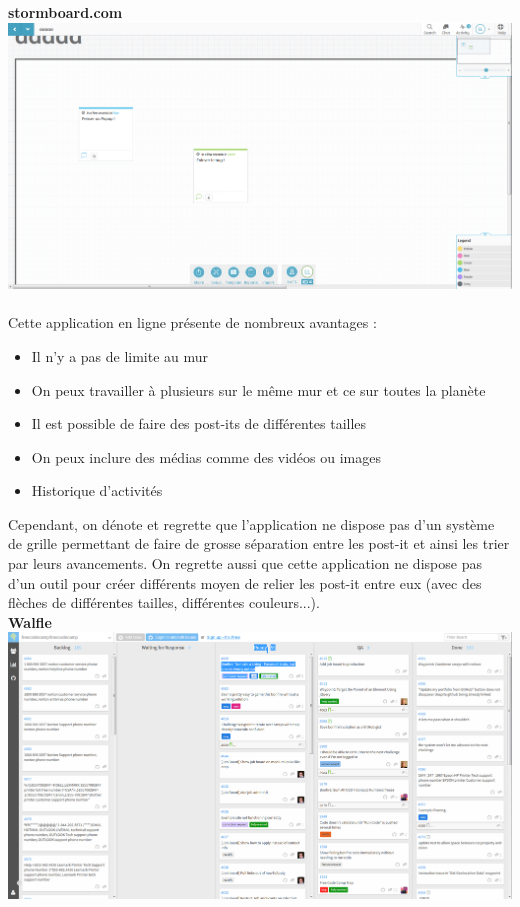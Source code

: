 \documentclass{article}
\begin{document}
\textbf{stormboard.com}
\vspace{0.2cm}\\
\includegraphics[width=\textwidth]{2}\\
\vspace{0.2cm}\\
Cette application en ligne présente de nombreux avantages :
\begin{itemize}
  \item Il n'y a pas de limite au mur
  \item On peux travailler à plusieurs sur le même mur et ce sur toutes la planète
  \item Il est possible de faire des post-its de différentes tailles
  \item On peux inclure des médias comme des vidéos ou images
  \item Historique d'activités
\end{itemize}
\vspace{0.2cm}
\hspace*{0.6cm}Cependant, on dénote et regrette que l'application ne dispose pas d'un système de grille permettant de faire de grosse séparation entre les post-it et ainsi les trier par leurs avancements. On regrette aussi que cette application ne dispose pas d'un outil pour créer différents moyen de relier les post-it entre eux (avec des flèches de différentes tailles, différentes couleurs...).
\vspace{0.2cm}\\
\textbf{Walfle}
\vspace{0.2cm}\\
\includegraphics[width=\textwidth]{4}\\
\end{document}
